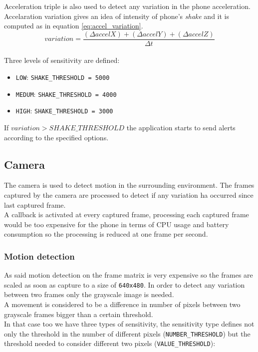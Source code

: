 \documentclass[conference]{IEEEtran}
\begin{document}
Acceleration triple is also used to detect any variation in the phone acceleration. Accelaration variation gives an idea of intensity of phone's \textit{shake} and it is computed as in equation \ref{eq:accel_variation}.\\

\begin{equation}
variation = \frac{(\Delta accelX)+(\Delta accelY)+(\Delta accelZ)}{\Delta t}
\label{eq:accel_variation}
\end{equation}
\vspace{.5cm}\\
Three levels of sensitivity are defined:
\begin{itemize}
	\item \texttt{LOW}: \texttt{SHAKE\_THRESHOLD = 5000}
	\item \texttt{MEDUM}:  \texttt{SHAKE\_THRESHOLD = 4000}
	\item \texttt{HIGH}:  \texttt{SHAKE\_THRESHOLD = 3000}
\end{itemize}

If $variation>SHAKE\_THRESHOLD$ the application starts to send alerts according to the specified options.

\subsection{\textbf{Camera}}
The camera is used to detect motion in the surrounding environment. The frames captured by the camera are processed to detect if any variation ha occurred since last captured frame.\\
A callback is activated at every captured frame, processing each captured frame would be too expensive for the phone in terms of CPU usage and battery consumption so the processing is reduced at one frame per second.\\
\subsubsection{\textbf{Motion detection}}
As said motion detection on the frame matrix is very expensive so the frames are scaled as soon as capture to a size of \texttt{640x480}. In order to detect any variation between two frames only the grayscale image is needed.\\
A movement is considered to be a difference in number of pixels between two grayscale frames bigger than a certain threshold.\\
In that case too we have three types of sensitivity, the sensitivity type defines not only the threshold in the number of different pixels (\texttt{NUMBER\_THRESHOLD}) but the threshold needed to consider different two pixels (\texttt{VALUE\_THRESHOLD}):\\
\end{document}
